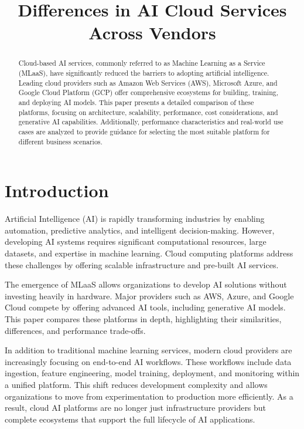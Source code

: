 \documentclass[conference]{IEEEtran}
\title{Differences in AI Cloud Services Across Vendors}
\author{
	\IEEEauthorblockN{Scott Nguyen}
	\IEEEauthorblockA{
		Department of Electrical and Computer Engineering\\
		University of New Mexico\\
		Email: snguyen9@unm.edu}
}
\begin{document}
	
	\maketitle
	
	\begin{abstract}
		Cloud-based AI services, commonly referred to as Machine Learning as a Service (MLaaS), have significantly reduced the barriers to adopting artificial intelligence. Leading cloud providers such as Amazon Web Services (AWS), Microsoft Azure, and Google Cloud Platform (GCP) offer comprehensive ecosystems for building, training, and deploying AI models. This paper presents a detailed comparison of these platforms, focusing on architecture, scalability, performance, cost considerations, and generative AI capabilities. Additionally, performance characteristics and real-world use cases are analyzed to provide guidance for selecting the most suitable platform for different business scenarios.
	\end{abstract}
	
	\section{Introduction}
	Artificial Intelligence (AI) is rapidly transforming industries by enabling automation, predictive analytics, and intelligent decision-making. However, developing AI systems requires significant computational resources, large datasets, and expertise in machine learning. Cloud computing platforms address these challenges by offering scalable infrastructure and pre-built AI services.
	
	The emergence of MLaaS allows organizations to develop AI solutions without investing heavily in hardware. Major providers such as AWS, Azure, and Google Cloud compete by offering advanced AI tools, including generative AI models. This paper compares these platforms in depth, highlighting their similarities, differences, and performance trade-offs.
	
	In addition to traditional machine learning services, modern cloud providers are increasingly focusing on end-to-end AI workflows. These workflows include data ingestion, feature engineering, model training, deployment, and monitoring within a unified platform. This shift reduces development complexity and allows organizations to move from experimentation to production more efficiently. As a result, cloud AI platforms are no longer just infrastructure providers but complete ecosystems that support the full lifecycle of AI applications.
	
\end{document}

